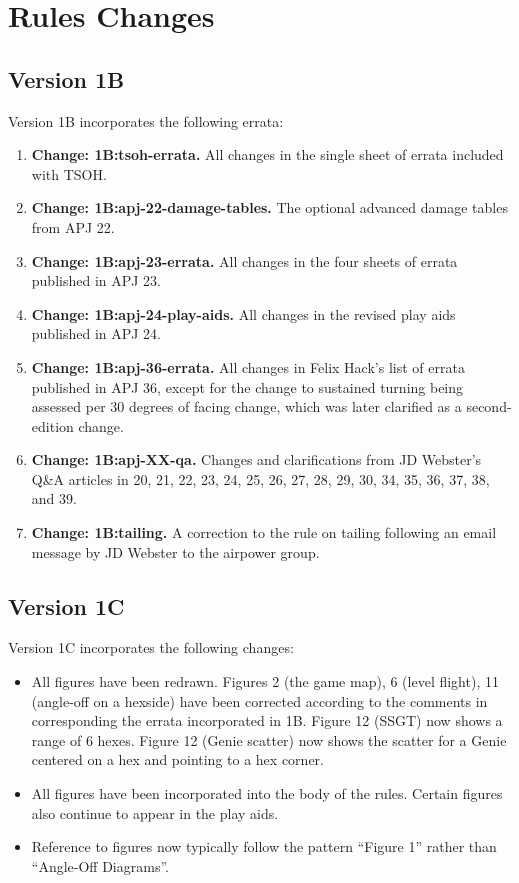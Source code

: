 \documentclass[10pt]{article}
\newcommand{\itemtag}[1]{\item \textbf{Change: #1.}}
\begin{document}
\section{Rules Changes}

\subsection{Version 1B}

Version 1B incorporates the following errata:

\begin{enumerate}
    \itemtag{1B:tsoh-errata} All changes in the single sheet of errata included with TSOH.
    \itemtag{1B:apj-22-damage-tables} The optional advanced damage tables from APJ 22.
    \itemtag{1B:apj-23-errata} All changes in the four sheets of errata published in APJ 23.
    \itemtag{1B:apj-24-play-aids} All changes in the revised play aids published in APJ 24. 
    \itemtag{1B:apj-36-errata} All changes in Felix Hack’s list of errata published in APJ 36, except for the change to sustained turning being assessed per 30 degrees of facing change, which was later clarified as a second-edition change.
    \itemtag{1B:apj-XX-qa} Changes and clarifications from JD Webster’s Q\&A articles in {\APJ} 20, 21, 22, 23, 24, 25, 26, 27, 28, 29, 30, 34, 35, 36, 37, 38, and 39.
    \itemtag{1B:tailing} A correction to the rule on tailing following an email message by JD Webster to the airpower group.    
\end{enumerate}

\subsection{Version 1C}

Version 1C incorporates the following changes:

\begin{itemize}
    \item All figures have been redrawn. Figures 2 (the game map), 6 (level flight), 11 (angle-off on a hexside) have been corrected according to the comments in corresponding the errata incorporated in 1B. Figure 12 (SSGT) now shows a range of 6 hexes. Figure 12 (Genie scatter) now shows the scatter for a Genie centered on a hex and pointing to a hex corner.
    \item All figures have been incorporated into the body of the rules. Certain figures also continue to appear in the play aids.
    \item Reference to figures now typically follow the pattern “Figure 1” rather than “Angle-Off Diagrams”.
\end{itemize}
\end{document}
